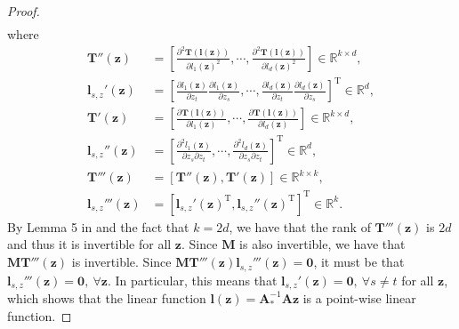 \documentclass{article} %
\theoremstyle{plain}
\theoremstyle{definition}
\theoremstyle{remark}
\begin{document}
\begin{proof}
\begin{align}
    \end{align}
    where
    \begin{align}
        \mathbf{T}''(\mathbf{z})&=\left[\frac{\partial^2 \mathbf{T}(\mathbf{l}(\mathbf{z}))}{\partial l_1(\mathbf{z})^2},\cdots,\frac{\partial^2 \mathbf{T}(\mathbf{l}(\mathbf{z}))}{\partial l_d(\mathbf{z})^2}\right]\in\mathbb{R}^{k\times d},\\
        \mathbf{l}_{s,z}'(\mathbf{z})&=\left[\frac{\partial l_1(\mathbf{z})}{\partial z_t} \frac{\partial l_1(\mathbf{z})}{\partial z_s},\cdots,\frac{\partial l_d(\mathbf{z})}{\partial z_t} \frac{\partial l_d(\mathbf{z})}{\partial z_s}\right]^{\text{T}}\in\mathbb{R}^{d},\\
        \mathbf{T}'(\mathbf{z})&=\left[\frac{\partial \mathbf{T}(\mathbf{l}(\mathbf{z}))}{\partial l_1(\mathbf{z})},\cdots,\frac{\partial \mathbf{T}(\mathbf{l}(\mathbf{z}))}{\partial l_d(\mathbf{z})}\right]\in\mathbb{R}^{k\times d},\\
        \mathbf{l}_{s,z}''(\mathbf{z})&=\left[\frac{\partial^2 l_1(\mathbf{z})}{\partial z_s \partial z_t},\cdots,\frac{\partial^2 l_d(\mathbf{z})}{\partial z_s \partial z_t}\right]^{\text{T}}\in\mathbb{R}^{d},\\
        \mathbf{T}'''(\mathbf{z})&=[\mathbf{T}''(\mathbf{z}),\mathbf{T}'(\mathbf{z})]\in\mathbb{R}^{k\times k},\\
        \mathbf{l}_{s,z}'''(\mathbf{z})&=[\mathbf{l}_{s,z}'(\mathbf{z})^{\text{T}},\mathbf{l}_{s,z}''(\mathbf{z})^{\text{T}}]^{\text{T}}\in\mathbb{R}^{k}.
    \end{align}
    By Lemma 5 in \citet{Khemakhem_Kingma_Monti_Hyvarinen_2020} and the fact that $k=2d$, we have that the rank of $\mathbf{T}'''(\mathbf{z})$ is $2d$ and thus it is invertible for all $\mathbf{z}$. Since $\mathbf{M}$ is also invertible, we have that $\mathbf{M}\mathbf{T}'''(\mathbf{z})$ is invertible. Since $\mathbf{M}\mathbf{T}'''(\mathbf{z})\mathbf{l}_{s,z}'''(\mathbf{z})=\mathbf{0}$, it must be that $\mathbf{l}_{s,z}'''(\mathbf{z})=\mathbf{0},~\forall\mathbf{z}$. In particular, this means that $\mathbf{l}_{s,z}'(\mathbf{z})=\mathbf{0},~\forall s\not=t$ for all $\mathbf{z}$, which shows that the linear function $\mathbf{l}(\mathbf{z})=\mathbf{A}_{*}^{-1}\mathbf{A}\mathbf{z}$ is a point-wise linear function.
    

\end{proof}
\end{document}
